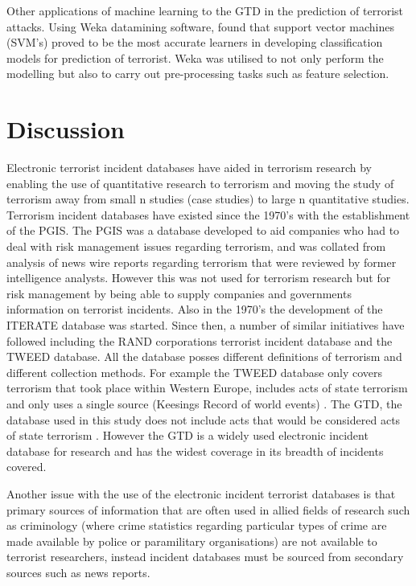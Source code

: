 Other applications of machine learning to the GTD in the prediction of terrorist attacks. Using Weka \citep{hall2009weka} datamining software, \citep{khorshid2015comparison} found that support vector machines (SVM's) proved to be the most accurate learners in developing classification models for prediction of terrorist. Weka was utilised to not only perform the modelling but also to carry out pre-processing tasks such as feature selection. 

\section{Discussion}

Electronic terrorist incident databases have aided in terrorism research by enabling the use of quantitative research to terrorism and moving the study of terrorism away from small n studies (case studies) to large n quantitative studies. Terrorism incident databases have existed since the 1970's with the establishment of the PGIS. The PGIS was a database developed to aid companies who had to deal with risk management issues regarding terrorism, and was collated from analysis of news wire reports regarding terrorism that were reviewed by former intelligence analysts. However this was not used for terrorism research but for risk management by being able to supply companies and governments information on terrorist incidents. Also in the 1970's the development of the ITERATE database was started. Since then, a number of similar initiatives have followed including the RAND corporations terrorist incident database and the TWEED database. All the database posses different definitions of terrorism and different collection methods. For example the TWEED database only covers terrorism that took place within Western Europe, includes acts of state terrorism and only uses a single source (Keesings Record of world events) \citep{ravndal2016right}. The GTD, the database used in this study does not include acts that would be considered acts of state terrorism \citep{lafree2016global}. However the GTD is a widely used electronic incident database for research and has the widest coverage in its breadth of incidents covered. 

Another issue with the use of the electronic incident terrorist databases is that primary sources of information that are often used in allied fields of research such as criminology (where crime statistics regarding particular types of crime are made available by police or paramilitary organisations) are not available to terrorist researchers, instead incident databases must be sourced from secondary sources such as news reports. 

